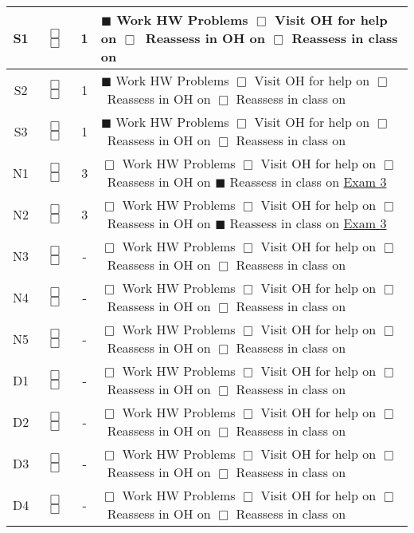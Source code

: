 \documentclass[letterpaper]{article}
\newcommand{\boxes}{\(\Box\) \(\Box\)}
\newcommand{\steps}{  \(\Box\) Work HW Problems \hspace{4em} \(\Box\) Visit OH for help on \uline{\hspace{5em}} \newline  \(\Box\)~Reassess in OH on \uline{\hspace{5em}} \(\Box\) Reassess in class on \uline{\hspace{5em}} }
\begin{document}
\begin{tabular}{|c|c|c|p{4.25in}|}
S1 & \boxes & 1  & \(\blacksquare\) Work HW Problems \hspace{4em} \(\Box\) Visit OH for help on \uline{\hspace{5em}} \newline  \(\Box\)~Reassess in OH on \uline{\hspace{5em}} \(\Box\) Reassess in class on \uline{\hspace{5em}}  \\  \hline
S2 & \boxes & 1 & \(\blacksquare\) Work HW Problems \hspace{4em} \(\Box\) Visit OH for help on \uline{\hspace{5em}} \newline  \(\Box\)~Reassess in OH on \uline{\hspace{5em}} \(\Box\) Reassess in class on \uline{\hspace{5em}} \\  \hline
S3 & \boxes & 1 & \(\blacksquare\) Work HW Problems \hspace{4em} \(\Box\) Visit OH for help on \uline{\hspace{5em}} \newline  \(\Box\)~Reassess in OH on \uline{\hspace{5em}} \(\Box\) Reassess in class on \uline{\hspace{5em}} \\  \hline
N1 & \boxes & 3 & \(\Box\) Work HW Problems \hspace{4em} \(\Box\) Visit OH for help on \uline{\hspace{5em}} \newline  \(\Box\)~Reassess in OH on \uline{\hspace{5em}} \(\blacksquare\) Reassess in class on \uline{Exam 3} \\  \hline
N2 & \boxes & 3 & \(\Box\) Work HW Problems \hspace{4em} \(\Box\) Visit OH for help on \uline{\hspace{5em}} \newline  \(\Box\)~Reassess in OH on \uline{\hspace{5em}} \(\blacksquare\) Reassess in class on \uline{Exam 3} \\  \hline
N3 & \boxes & - & \steps \\  \hline
N4 & \boxes &- & \steps \\  \hline
N5 & \boxes &-& \steps \\  \hline
D1 & \boxes &- & \steps \\  \hline
D2 & \boxes &- & \steps \\  \hline
D3 & \boxes &- & \steps \\  \hline
D4 & \boxes &- & \steps \\  \hline
\end{tabular}
\end{document}
